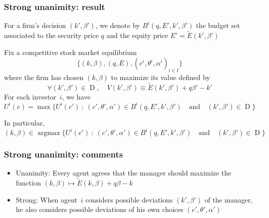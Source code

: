 \documentclass[blue]{beamer}
\def\et{\quad \textrm{and} \quad}
\DeclareMathOperator\argmax{argmax}
\DeclareMathOperator\A{D}
\theoremstyle{definition}
\theoremstyle{example}
\begin{document}
\begin{frame}\frametitle{Strong unanimity: result}
For a firm's decision $(k',\beta')$, we denote by $B^i(q,E',k',\beta')$ the budget set associated to the security price $q$ and the equity price $E' = \widetilde{E}(k',\beta')$
\begin{theorem}
Fix a competitive stock market equilibrium
\[
\{(k,\beta),(q,E),(c^i,\theta^i,\alpha^i)_{i\in I}\}
\]
where the firm has chosen $(k,\beta)$ to maximize its value defined by
\[
\forall (k',\beta') \in \A,\quad V(k',\beta') \equiv \widetilde{E}(k',\beta') + q \beta' - k'
\]
For each investor~$i$, we have
\[
U^i(c) = \max \{ U^i(c') \ \colon \ (c',\theta',\alpha') \in B^i(q,E',k',\beta') \et (k',\beta') \in \A \}
\]
\end{theorem}
In particular,
\[
(k,\beta) \in \argmax \{ U^i(c') \ \colon \ (c',\theta',\alpha') \in B^i(q,E',k',\beta') \et (k',\beta') \in \A \}
\]
\end{frame}
\begin{frame}\frametitle{Strong unanimity: comments}
\begin{itemize}
\item \alert{Unanimity}: Every agent agrees that the manager should maximize the function $(k,\beta) \mapsto \widetilde{E}(k,\beta) + q\beta -k$
\item \alert{Strong}: When agent~$i$ considers possible deviations $(k',\beta')$ of the manager, he also considers possible deviations of his own choices $(c',\theta',\alpha')$
\end{itemize}
\end{frame}
\end{document}
